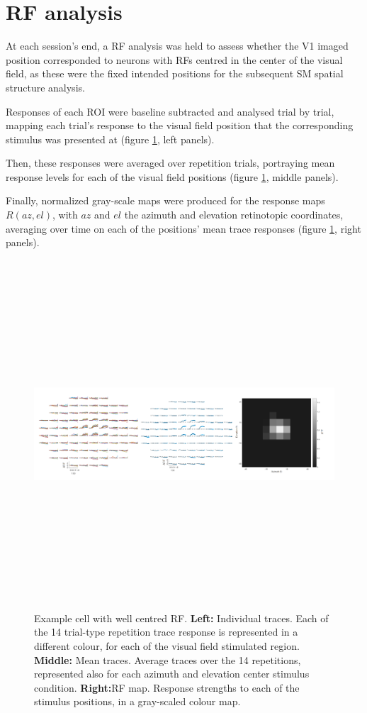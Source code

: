 \section{RF analysis}

At each session's end, a RF analysis was held to assess whether the V1 imaged position corresponded to neurons with RFs centred in the center of the visual field, as these were the fixed intended positions for the subsequent SM spatial structure analysis.

Responses of each ROI were baseline subtracted and analysed trial by trial, mapping each trial's response to the visual field position that the corresponding stimulus was presented at (figure \ref{rfanalysis}, left panels).

Then, these responses were averaged over repetition trials, portraying mean response levels for each of the visual field positions (figure \ref{rfanalysis}, middle panels).

Finally, normalized gray-scale maps were produced for the response maps $R(az, el)$, with $az$ and $el$ the azimuth and elevation retinotopic coordinates, averaging over time on each of the positions' mean trace responses (figure \ref{rfanalysis}, right panels).

\begin{figure}[H] \centering \includegraphics[width=13cm,height=13cm,keepaspectratio]{Figures/7.Results/rf/rf1.png} 
\caption{Example cell with well centred RF. 
\newline \textbf{Left:} Individual traces. Each of the 14 trial-type repetition trace response is represented in a different colour, for each of the visual field stimulated region. 
\newline \textbf{Middle:} Mean traces. Average traces over the 14 repetitions, represented also for each azimuth and elevation center stimulus condition. 
\newline \textbf{Right:}RF map. Response strengths to each of the stimulus positions, in a gray-scaled colour map.}
\label{rfanalysis}
\end{figure}

